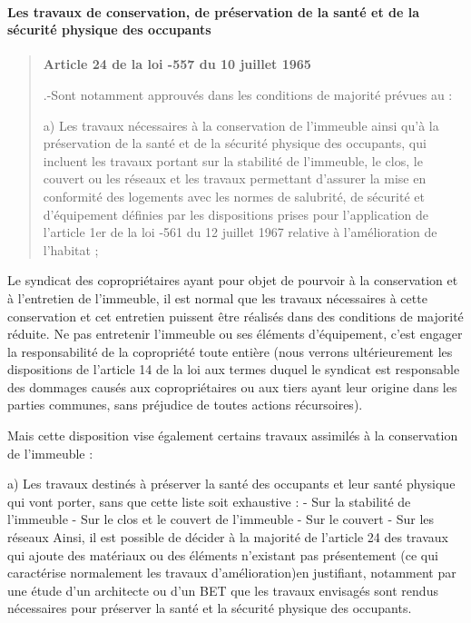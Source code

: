 			\paragraph{Les travaux de conservation, de préservation de la santé et de la sécurité physique des occupants}
			
				\begin{quote}
					\textbf{Article 24 de la loi -557 du 10 juillet 1965}
					
					\medskip \II.-Sont notamment approuvés dans les conditions de majorité prévues au \I :
				
					\medskip a) Les travaux nécessaires à la conservation de l'immeuble ainsi qu'à la préservation de la santé et de la sécurité physique des occupants, qui incluent les travaux portant sur la stabilité de l'immeuble, le clos, le couvert ou les réseaux et les travaux permettant d'assurer la mise en conformité des logements avec les normes de salubrité, de sécurité et d'équipement définies par les dispositions prises pour l'application de l'article 1er de la loi -561 du 12 juillet 1967 relative à l'amélioration de l'habitat ;
				\end{quote}
				
				Le syndicat des copropriétaires ayant pour objet de pourvoir à la conservation et à l'entretien de l’immeuble, il est normal que les travaux nécessaires à cette conservation et cet entretien puissent être réalisés dans des conditions de majorité réduite. Ne pas entretenir l’immeuble ou
				ses éléments d’équipement, c’est engager la responsabilité de la copropriété toute entière (nous verrons ultérieurement les dispositions de l’article 14 de la loi aux termes duquel le syndicat est responsable des dommages causés aux copropriétaires ou aux tiers ayant leur origine dans les parties communes, sans préjudice de toutes actions récursoires).
				
				Mais cette disposition vise également certains travaux assimilés à la conservation de l’immeuble :
				
				a) Les travaux destinés à préserver la santé des occupants et leur santé physique qui vont porter, sans que cette liste soit exhaustive :
				- Sur la stabilité de l’immeuble
				- Sur le clos et le couvert de l’immeuble
				- Sur le couvert
				- Sur les réseaux
				Ainsi, il est possible de décider à la majorité de l’article 24 des travaux qui ajoute des matériaux ou des éléments n’existant pas présentement (ce qui caractérise normalement les travaux d’amélioration)en justifiant, notamment par une étude d’un architecte ou d’un BET que les travaux envisagés sont rendus nécessaires pour préserver la santé et la sécurité physique des occupants.
				
